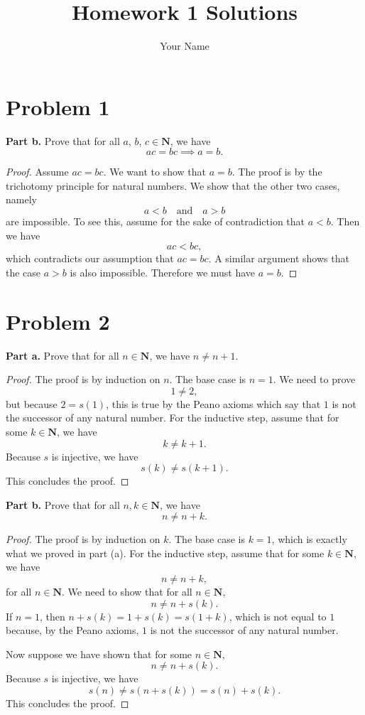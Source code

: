 \documentclass{article}
\begin{document}
\title{Homework 1 Solutions}
\author{Your Name}
\maketitle
\section*{Problem 1}
\textbf{Part b.} Prove that for all $a$, $b$, $c \in \mathbf{N}$, we have
\[
    ac = bc \implies a = b.
\]
\begin{proof}
Assume $ac = bc$. We want to show that $a = b$. The proof is by the trichotomy
principle for natural numbers. We show that the other two cases, namely
\[
    a < b \quad \text{and} \quad a > b
\]
are impossible. To see this, assume for the sake of contradiction that $a < b$. Then we have
\[
    ac < bc,
\]
which contradicts our assumption that $ac = bc$. A similar argument shows that the case 
$a > b$ is also impossible. Therefore we must have $a = b$.
\end{proof}
\section*{Problem 2}
\textbf{Part a.} Prove that for all $n \in \mathbf{N}$, we have $n \ne n + 1$.
\begin{proof}
    The proof is by induction on $n$. The base case is $n = 1$. We need to prove
    \[
        1 \ne 2,
    \]
    but because $2 = s(1)$, this is true by the Peano axioms which say that 
    $1$ is not the successor of any natural number. For the inductive step, assume
    that for some $k \in \mathbf{N}$, we have
    \[
        k \ne k + 1.
    \]
    Because $s$ is injective, we have
    \[
        s(k) \ne s(k + 1).
    \]
    This concludes the proof.
\end{proof}
\textbf{Part b.} Prove that for all $n, k\in \mathbf{N}$, we have
\[
    n \ne n + k.
\]
\begin{proof}
    The proof is by induction on $k$. The base case is $k = 1$, which is exactly what we
    proved in part (a). For the inductive step, assume that for some $k \in \mathbf{N}$,
    we have
    \[
        n \ne n + k,
    \]
    for all $n \in \mathbf{N}$. We need to show that for all $n \in \mathbf{N}$,
    \[
        n \ne n + s(k).
    \]
    If $n = 1$, then $n + s(k) = 1 + s(k) = s(1 + k)$, which is not equal to $1$
    because, by the Peano axioms, $1$ is not the successor of any natural number.

    Now suppose we have shown that for some $n \in \mathbf{N}$,
    \[
        n \ne n + s(k).
    \]
    Because $s$ is injective, we have
    \[
        s(n) \ne s(n + s(k)) = s(n) + s(k).
    \]
    This concludes the proof.
\end{proof}
\end{document}

